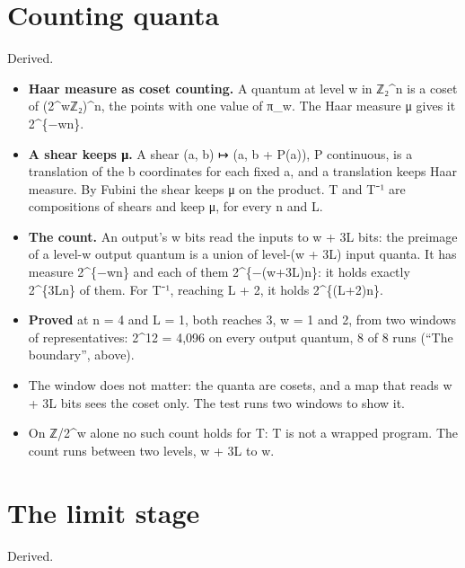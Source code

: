 \section{\texorpdfstring{Counting quanta}{Counting quanta}}

Derived.

\begin{itemize}
\item \textbf{Haar measure as coset counting.} A quantum at level w in ℤ₂\textasciicircum{}n is a coset of (2\textasciicircum{}wℤ₂)\textasciicircum{}n, the points with one value of π\_\allowbreak{}w. The Haar measure μ gives it 2\textasciicircum{}\{−wn\}.
\item \textbf{A shear keeps μ.} A shear (a, b) ↦ (a, b + P(a)), P continuous, is a translation of the b coordinates for each fixed a, and a translation keeps Haar measure. By Fubini the shear keeps μ on the product. T and T⁻¹ are compositions of shears and keep μ, for every n and L.
\item \textbf{The count.} An output's w bits read the inputs to w + 3L bits: the preimage of a level-w output quantum is a union of level-(w + 3L) input quanta. It has measure 2\textasciicircum{}\{−wn\} and each of them 2\textasciicircum{}\{−(w+3L)n\}: it holds exactly 2\textasciicircum{}\{3Ln\} of them. For T⁻¹, reaching L + 2, it holds 2\textasciicircum{}\{(L+2)n\}.
\item \textbf{Proved} at n = 4 and L = 1, both reaches 3, w = 1 and 2, from two windows of representatives: 2\textasciicircum{}12 = 4,096 on every output quantum, 8 of 8 runs (“The boundary”, above).
\item The window does not matter: the quanta are cosets, and a map that reads w + 3L bits sees the coset only. The test runs two windows to show it.
\item On ℤ/2\textasciicircum{}w alone no such count holds for T: T is not a wrapped program. The count runs between two levels, w + 3L to w.
\end{itemize}

\section{\texorpdfstring{The limit stage}{The limit stage}}

Derived.

